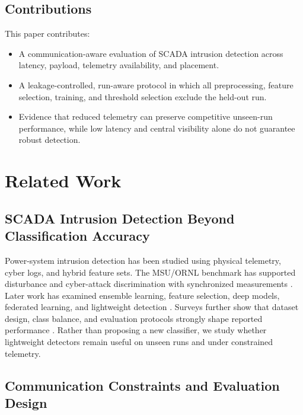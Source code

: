 \documentclass[conference]{IEEEtran}
\begin{document}
\subsection{Contributions}

This paper contributes:

\begin{itemize}
\item A communication-aware evaluation of SCADA intrusion detection across
latency, payload, telemetry availability, and placement.

\item A leakage-controlled, run-aware protocol in which all preprocessing,
feature selection, training, and threshold selection exclude the held-out run.

\item Evidence that reduced telemetry can preserve competitive unseen-run
performance, while low latency and central visibility alone do not guarantee
robust detection.
\end{itemize}



\section{Related Work}

\subsection{SCADA Intrusion Detection Beyond Classification Accuracy}

Power-system intrusion detection has been studied using physical telemetry,
cyber logs, and hybrid feature sets. The MSU/ORNL benchmark has supported
disturbance and cyber-attack discrimination with synchronized measurements
\cite{borges2014machine,pan2015hybrid,pan2015disturbances}. Later work has
examined ensemble learning, feature selection, deep models, federated
learning, and lightweight detection
\cite{upadhyay2021intrusion,yang2019deep,wang2022lightweight,shao2024automated}.
Surveys further show that dataset design, class balance, and evaluation
protocols strongly shape reported performance
\cite{sahani2023machine,alimi2021review}. Rather than proposing a new
classifier, we study whether lightweight detectors remain useful on unseen
runs and under constrained telemetry.

\subsection{Communication Constraints and Evaluation Design}
\end{document}

